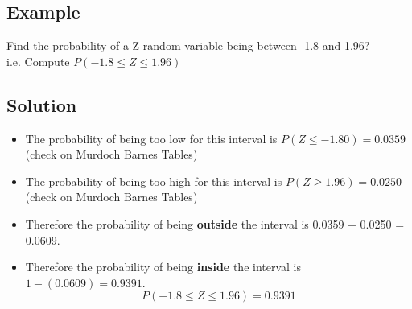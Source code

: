 \documentclass[a4paper,12pt]{article}
\begin{document}
\subsection*{Example}

Find the probability of a Z random variable being between -1.8 and 1.96?\\
i.e. Compute $P(-1.8 \leq Z \leq 1.96)$
\subsection*{Solution}
\begin{itemize}
\item
The probability of being too low for this interval is $P(Z \leq -1.80) = 0.0359$ (check on Murdoch Barnes Tables)
\item
The probability of being too high for this interval is $P(Z \geq 1.96) = 0.0250$ (check on Murdoch Barnes Tables)
\item
Therefore the probability of being \textbf{outside} the interval is 0.0359 + 0.0250 = 0.0609.
\item
Therefore the probability of being \textbf{inside} the interval is $1- (0.0609) = 0.9391$.
\[P(-1.8 \leq Z \leq 1.96) = 0.9391\]
\end{itemize}
\end{document}

